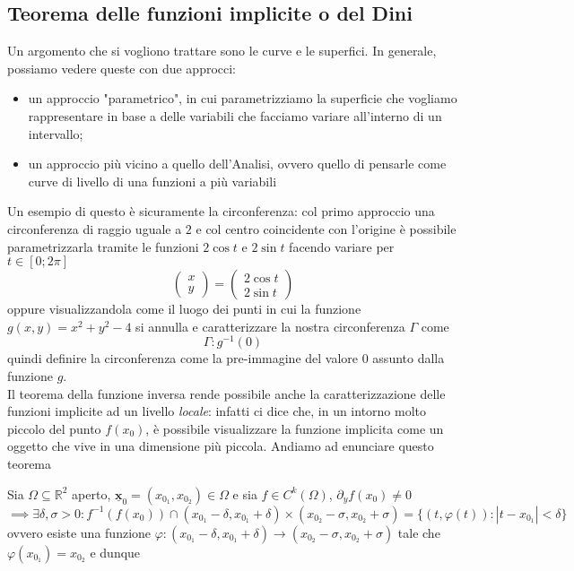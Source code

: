 \documentclass[openany, italian]{book}
\begin{document}
\begin{theorem}
\section{Teorema delle funzioni implicite o del Dini}
Un argomento che si vogliono trattare sono le curve e le superfici. In generale, possiamo vedere queste con due approcci:
\begin{itemize}
	\item un approccio "parametrico", in cui parametrizziamo la superficie che vogliamo rappresentare in base a delle variabili che facciamo variare all'interno di un intervallo;
	\item un approccio più vicino a quello dell'Analisi, ovvero quello di pensarle come curve di livello di una funzioni a più variabili
\end{itemize}
Un esempio di questo è sicuramente la circonferenza: col primo approccio una circonferenza di raggio uguale a $2$ e col centro coincidente con l'origine è possibile parametrizzarla tramite le funzioni $2\cos{t}$ e $2\sin{t}$ facendo variare per $t \in [0; 2\pi]$
$$
\begin{pmatrix}
	x \\
	y
\end{pmatrix} = \begin{pmatrix}
	2\cos{t} \\
	2\sin{t}
\end{pmatrix}
$$
oppure visualizzandola come il luogo dei punti in cui la funzione $g(x, y) = x^2 + y^2 - 4$ si annulla e caratterizzare la nostra circonferenza $\Gamma$ come
$$
\Gamma : g^{-1}(0)
$$
quindi definire la circonferenza come la pre-immagine del valore $0$ assunto dalla funzione $g$. \\
Il teorema della funzione inversa rende possibile anche la caratterizzazione delle funzioni implicite ad un livello \emph{locale}: infatti ci dice che, in un intorno molto piccolo del punto $f(x_0)$, è possibile visualizzare la funzione implicita come un oggetto che vive in una dimensione più piccola. Andiamo ad enunciare questo teorema
\begin{theorem}
Sia $\Omega \subseteq \mathbb{R}^2$ aperto, $\bm{\underline{x}}_0 = (x_{0_1}, x_{0_2}) \in \Omega$ e sia $f \in C^k (\Omega)$, $\partial_y f(x_0) \neq 0$
$$\implies \exists \delta, \sigma > 0 : f^{-1}(f(x_0)) \cap (x_{0_1}-\delta, x_{0_1}+\delta) \times (x_{0_2} - \sigma, x_{0_2}+\sigma) = \{(t, \varphi(t)) : |t-x_{0_1}| < \delta \}$$
ovvero esiste una funzione $\varphi: (x_{0_1} - \delta, x_{0_1} + \delta) \to (x_{0_2}-\sigma, x_{0_2} + \sigma)$ tale che $\varphi(x_{0_1}) = x_{0_2}$ e dunque

\end{theorem}
\end{theorem}
\end{document}
